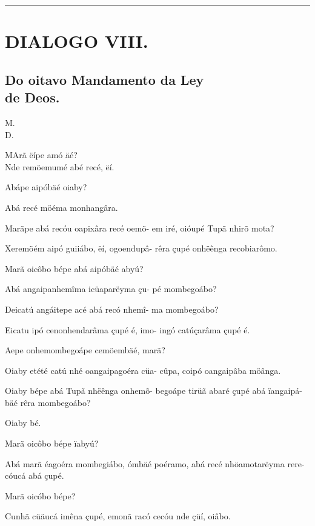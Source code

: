 \documentclass[openany,titlepage,12pt]{book}
\renewcommand{\chaptermark}[1]{\markboth{#1}{}}
\renewcommand{\sectionmark}[1]{\gdef\rightmark{#1}}
\newcommand{\lgS}{\char"017F}
\newcommand{\comecalista}[5]{
    \hspace*{-11.7pt}
    \begin{minipage}[t]{0.08\linewidth}
        \flushright #1\\#2
    \end{minipage}
    \hspace{0pt}
    \begin{minipage}[t]{0.94\linewidth}
        \lettrine
        [findent =2pt, nindent=0pt,  lines=2]
        {#3}{#4}#5
    \end{minipage}
    \vspace*{-3pt}
}
\begin{document}
\vspace{2pt}
\par\noindent\rule{\textwidth}{0.4pt}
\unskip\vspace*{2pt}
\section{DIALOGO VIII.}
\unskip\vspace{2pt}
\subsection{Do oitavo Mandamento da Ley\\de Deos.}

\chaptermark{Dialogo VIII.}
\sectionmark{Não levantarás fal\lgS o te\lgS tem.}
\vspace*{6pt}

\comecalista{M.}{D.}{M}{A}
{rã ëípe amó äé?\\
 Nde remöemumé abé recé, ëí.
}
\begin{alternate}
    \item Abápe aipóbäé oiaby?
    \item Abá recé möéma monhangâra.
    \item Marãpe abá recóu oapixâra recé oemö-
        em iré, oióupé Tupã nhirõ mota?
    \item Xeremöém aipó guiiábo, ëí, ogoendupâ-
        rêra çupé onhëênga recobiarômo.
    \item Marã oicôbo bépe abá aipóbäé abyú?
    \item Abá angaipanhemîma icüaparëyma çu-
        pé mombegoábo?
    \item Deicatú angáitepe acé abá recó nhemî-
        ma mombegoábo?
    \item Eicatu ipó cenonhendarâma çupé é, imo-
        ingó catúçarâma çupé é.
    \item Aepe onhemombegoápe cemöembäé,\linebreak
        marã?
    \item Oiaby etété catú nhé oangaipagoéra cüa-
        cûpa, coipó oangaipâba möânga.
    \item Oiaby bépe abá Tupã nhëênga onhemõ-
        begoápe tirüã abaré çupé abá ïangaipá-\linebreak
        bäé rêra mombegoábo?
    \item Oiaby bé.
    \item Marã oicôbo bépe ïabyú?
    \item Abá marã éagoéra mombegiábo, ómbäé
        poéramo, abá recé nhöamotarëyma rere-
        cóucá abá çupé.
    \item Marã oicóbo bépe?
    \item Cunhã cüäucá  imêna çupé, emonã racó
        cecóu nde çüí, oiâbo.
\end{alternate}
\end{document}
